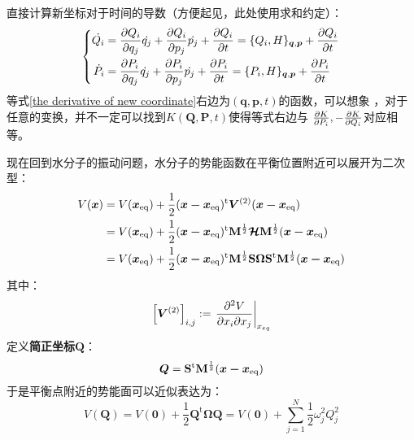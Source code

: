     直接计算新坐标对于时间的导数（方便起见，此处使用求和约定）：
    \begin{equation}
        \left\{
            \begin{split}
                \dot{Q_i} &= \frac{\partial{Q_i}}{\partial{q_{j}}}\dot{q_{j}} + \frac{\partial{Q_i}}{\partial{p_j}}\dot{p_j}
                + \frac{\partial{Q_i}}{\partial{t}} = \{Q_i, H\}_{\bm{q},\bm{p}} + \frac{\partial{Q_i}}{\partial{t}}\\
                \dot{P_i} &= \frac{\partial{P_i}}{\partial{q_{j}}}\dot{q_{j}} + \frac{\partial{P_i}}{\partial{p_j}}\dot{p_j}
                + \frac{\partial{P_i}}{\partial{t}} = \{P_i, H\}_{\bm{q},\bm{p}} + \frac{\partial{P_i}}{\partial{t}}
            \end{split}
        \right.
        \label{the derivative of new coordinate}
    \end{equation}
    等式\ref{the derivative of new coordinate}右边为$(\bm{q},\bm{p},t)$的函数，可以想象
    ，对于任意的变换，并不一定可以找到$K(\bm{Q},\bm{P},t)$使得等式右边与
    $\frac{\partial{K}}{\partial{P_{i}}},-\frac{\partial{K}}{\partial{Q_i}}$对应相等。
    
    \splitline

    现在回到水分子的振动问题，水分子的势能函数在平衡位置附近可以展开为二次型：
    \begin{equation}
        \begin{split}
        V(\bm{x}) &= V(\bm{x}_\mathrm{eq}) + \frac 12 (\bm{x-x}_\mathrm{eq})^\mathrm{t} \bm{V}^{(2)} (\bm{x-x}_\mathrm{eq})\\
        &= V(\bm{x}_\mathrm{eq}) + \frac 12 (\bm{x-x}_\mathrm{eq})^\mathrm{t} \mathbf{M}^{\frac 12}\bm{\mathcal{H}} \mathbf{M}^{\frac 12} (\bm{x-x}_\mathrm{eq})\\
        &= V(\bm{x}_\mathrm{eq}) + \frac 12 (\bm{x-x}_\mathrm{eq})^\mathrm{t} \mathbf{M}^{\frac 12} \mathbf{S}\bm{\Omega} \mathbf{S}^\mathrm{t} \mathbf{M}^{\frac 12} (\bm{x-x}_\mathrm{eq})
        \end{split}
    \end{equation}
    其中：
    \begin{equation}
        \left[\bm{V}^{(2)}\right]_{i,j} := \left.\frac{\partial{^2 V}}{\partial{x_i\partial x_j}}\right|_{x_{eq}}
    \end{equation}
    定义\textbf{简正坐标}$\bm{Q}$：
    \begin{equation}
        \bm{Q} = \mathbf{S}^\mathrm{t} \mathbf{M}^{\frac 12} (\bm{x-x}_\mathrm{eq})
    \end{equation}
    于是平衡点附近的势能面可以近似表达为：
    \begin{equation}
        V(\bm{Q}) = V(\bm{0}) + \frac 12 \bm{Q}^\mathrm{t} \bm{\Omega Q} = V(\bm{0}) + \sum_{j=1}^N \frac 12 \omega_j^2 Q_j^2
    \end{equation}

